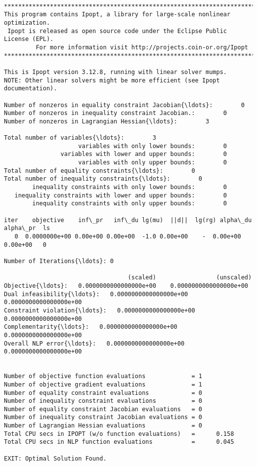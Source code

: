 \documentclass[11pt]{article}
\begin{document}
    \begin{Verbatim}[commandchars=\\\{\}]

******************************************************************************
This program contains Ipopt, a library for large-scale nonlinear optimization.
 Ipopt is released as open source code under the Eclipse Public License (EPL).
         For more information visit http://projects.coin-or.org/Ipopt
******************************************************************************

This is Ipopt version 3.12.8, running with linear solver mumps.
NOTE: Other linear solvers might be more efficient (see Ipopt documentation).

Number of nonzeros in equality constraint Jacobian{\ldots}:        0
Number of nonzeros in inequality constraint Jacobian.:        0
Number of nonzeros in Lagrangian Hessian{\ldots}:        3

Total number of variables{\ldots}:        3
                     variables with only lower bounds:        0
                variables with lower and upper bounds:        0
                     variables with only upper bounds:        0
Total number of equality constraints{\ldots}:        0
Total number of inequality constraints{\ldots}:        0
        inequality constraints with only lower bounds:        0
   inequality constraints with lower and upper bounds:        0
        inequality constraints with only upper bounds:        0

iter    objective    inf\_pr   inf\_du lg(mu)  ||d||  lg(rg) alpha\_du alpha\_pr  ls
   0  0.0000000e+00 0.00e+00 0.00e+00  -1.0 0.00e+00    -  0.00e+00 0.00e+00   0

Number of Iterations{\ldots}: 0

                                   (scaled)                 (unscaled)
Objective{\ldots}:   0.0000000000000000e+00    0.0000000000000000e+00
Dual infeasibility{\ldots}:   0.0000000000000000e+00    0.0000000000000000e+00
Constraint violation{\ldots}:   0.0000000000000000e+00    0.0000000000000000e+00
Complementarity{\ldots}:   0.0000000000000000e+00    0.0000000000000000e+00
Overall NLP error{\ldots}:   0.0000000000000000e+00    0.0000000000000000e+00


Number of objective function evaluations             = 1
Number of objective gradient evaluations             = 1
Number of equality constraint evaluations            = 0
Number of inequality constraint evaluations          = 0
Number of equality constraint Jacobian evaluations   = 0
Number of inequality constraint Jacobian evaluations = 0
Number of Lagrangian Hessian evaluations             = 0
Total CPU secs in IPOPT (w/o function evaluations)   =      0.158
Total CPU secs in NLP function evaluations           =      0.045

EXIT: Optimal Solution Found.

    \end{Verbatim}
\end{document}

